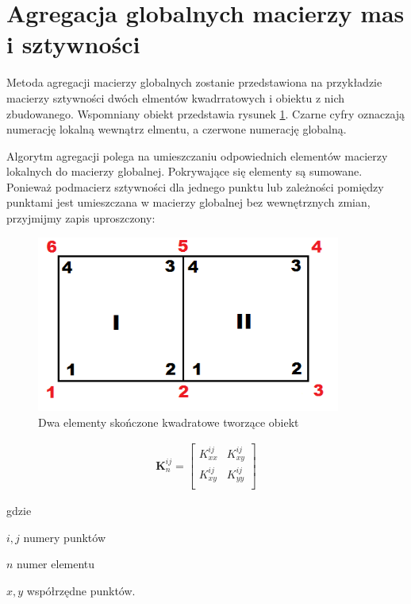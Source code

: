 
\section{Agregacja globalnych macierzy mas i sztywności}
\label{sec:agregacja}

Metoda agregacji macierzy globalnych zostanie przedstawiona na przykładzie macierzy sztywności dwóch elmentów kwadrratowych i obiektu z nich zbudowanego. Wspomniany obiekt przedstawia rysunek \ref{fig:agreg}. Czarne cyfry oznaczają numerację lokalną wewnątrz elmentu, a czerwone numerację globalną.

Algorytm agregacji polega na umieszczaniu odpowiednich elementów macierzy lokalnych do macierzy globalnej. Pokrywające się elementy są sumowane. Ponieważ podmacierz sztywności dla jednego punktu lub zależności pomiędzy punktami jest umieszczana w macierzy globalnej bez wewnętrznych zmian, przyjmijmy zapis uproszczony:

\begin{figure}[h]
\centering
\includegraphics[width=10cm]{Zdjecia/3/agregacja}
\caption{Dwa elementy skończone kwadratowe tworzące obiekt}
\label{fig:agreg}
\end{figure}

\begin{gather}
	\textbf{K}_n^{ij} = \begin{bmatrix} 
	 	K^{ij}_{xx} & K^{ij}_{xy} \\
	 	K^{ij}_{xy} & K^{ij}_{yy} \\
	\end{bmatrix}
\end{gather}

gdzie
\begin{eqwhere}[2cm]
	\item[$i, j$] numery punktów
	\item[$n$] numer elementu
	\item[$x, y$] współrzędne punktów.
\end{eqwhere}

